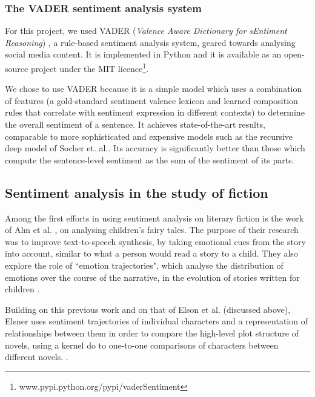 \documentclass[bsc,frontabs,singlespacing,parskip, twoside]{infthesis}
\begin{document}
\subsubsection{The VADER sentiment analysis system}

For this project, we used VADER (\textit{Valence Aware Dictionary for sEntiment Reasoning}) \cite{hutto2014vader}, a rule-based sentiment analysis system, geared towards analysing social media content. It is implemented in Python and it is available as an open-source project under the MIT licence\footnote{www.pypi.python.org/pypi/vaderSentiment}.

We chose to use VADER because it is a simple model which uses a combination of features (a gold-standard sentiment valence lexicon and learned composition rules that correlate with sentiment expression in different contexts) to determine the overall sentiment of a sentence. It achieves state-of-the-art results, comparable to more sophisticated and expensive models such as the recursive deep model of Socher et. al.\cite{socher2013recursive}. Its accuracy is significantly better than those which compute the sentence-level sentiment as the sum of the sentiment of its parts.


\subsection{Sentiment analysis in the study of fiction}
Among the first efforts in using sentiment analysis on literary fiction is the work of Alm et al. \cite{alm2005emotions}, on analysing children's fairy tales. The purpose of their research was to improve text-to-speech synthesis, by taking emotional cues from the story into account, similar to what a person would read a story to a child. They also explore the role of ``emotion trajectories", which analyse the distribution of emotions over the course of the narrative, in the evolution of stories written for children \cite{alm2005emotional}.

Building on this previous work and on that of Elson et al. \cite{Elson2010} (discussed above), Elsner uses sentiment trajectories of individual characters and a representation of relationships between them in order to compare the high-level plot structure of novels, using a kernel do to one-to-one comparisons of characters between different novels. \cite{elsner2012character}.
\end{document}
